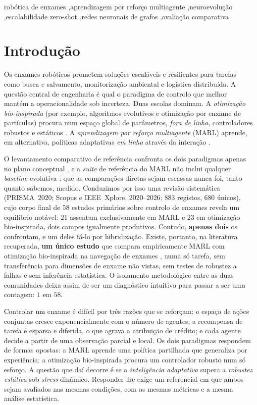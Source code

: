 \documentclass[final,5p,times,twocolumn,authoryear]{elsarticle}
\begin{document}
\begin{frontmatter}
\begin{keyword}
robótica de enxames \sep aprendizagem por reforço multiagente \sep neuroevolução
\sep escalabilidade zero-shot \sep redes neuronais de grafos \sep avaliação comparativa
\end{keyword}

\end{frontmatter}

\section{Introdução}
\label{sec:intro}
Os enxames robóticos prometem soluções escaláveis e resilientes para tarefas como
busca e salvamento, monitorização ambiental e logística distribuída. A questão
central de engenharia é qual o paradigma de controlo que melhor mantém a
operacionalidade sob incerteza. Duas escolas dominam. A \emph{otimização
bio-inspirada} (por exemplo, algoritmos evolutivos e otimização por enxame de
partículas) procura num espaço global de parâmetros, \emph{fora de linha},
controladores robustos e estáticos \citep{kennedy1995pso}. A \emph{aprendizagem
por reforço multiagente} (MARL) aprende, em alternativa, políticas adaptativas
\emph{em linha} através da interação \citep{huh2023marl}.

O levantamento comparativo de referência confronta os dois paradigmas apenas no
plano conceptual \citep{majid2023deep}, e a \textit{suite} de referência do MARL
não inclui qualquer \emph{baseline} evolutiva \citep{bettini2024benchmarl}; que
as comparações diretas sejam escassas nunca foi, tanto quanto sabemos, medido. Conduzimos por isso uma revisão
sistemática (PRISMA~2020; Scopus e IEEE~Xplore, 2020--2026; $883$ registos,
$680$ únicos), cujo corpo final de $58$ estudos primários sobre controlo de
enxames revela um equilíbrio notável: $21$ assentam exclusivamente em MARL e $23$
em otimização bio-inspirada, dois campos igualmente produtivos. Contudo,
\textbf{apenas dois} os confrontam, e um deles fá-lo por hibridização. Existe,
portanto, na literatura recuperada, \textbf{um único estudo} que compara
empiricamente MARL com otimização bio-inspirada na navegação de enxames
\citep{iskandar2024comparative}, numa só tarefa, sem transferência para
dimensões de enxame não vistas, sem testes de robustez a falhas e sem inferência
estatística. O isolamento metodológico
entre as duas comunidades deixa assim de ser um diagnóstico intuitivo para passar
a ser uma contagem: $1$ em $58$.

Controlar um enxame é difícil por três razões que se reforçam: o espaço de ações
conjuntas cresce exponencialmente com o número de agentes; a recompensa de tarefa
é esparsa e diferida, o que agrava a atribuição de crédito; e cada agente decide a
partir de uma observação parcial e local. Os dois paradigmas respondem de formas
opostas: a MARL aprende uma política partilhada que generaliza por experiência;
a otimização bio-inspirada procura um controlador robusto num só esforço. A
questão que daí decorre é se a \emph{inteligência adaptativa} supera a
\emph{robustez estática} sob \emph{stress} dinâmico. Responder-lhe exige um
referencial em que ambos sejam avaliados nas mesmas condições, com as mesmas
métricas e a mesma análise estatística.
\end{document}
